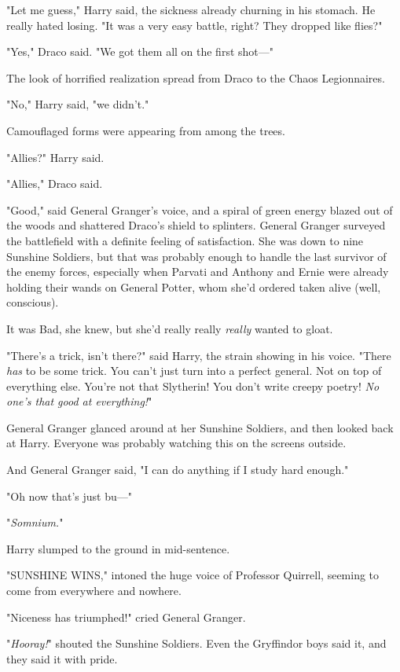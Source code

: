 "Let me guess," Harry said, the sickness already churning in his stomach. He
really hated losing. "It was a very easy battle, right? They dropped like
flies?"

"Yes," Draco said. "We got them all on the first shot\mbox{---}"

The look of horrified realization spread from Draco to the Chaos Legionnaires.

"No," Harry said, "we didn't."

Camouflaged forms were appearing from among the trees.

"Allies?" Harry said.

"Allies," Draco said.

"Good," said General Granger's voice, and a spiral of green energy blazed out
of the woods and shattered Draco's shield to splinters.
\sbreak
General Granger surveyed the battlefield with a definite feeling of
satisfaction. She was down to nine Sunshine Soldiers, but that was probably
enough to handle the last survivor of the enemy forces, especially when Parvati
and Anthony and Ernie were already holding their wands on General Potter, whom
she'd ordered taken alive (well, conscious).

It was Bad, she knew, but she'd really really \emph{really} wanted to gloat.

"There's a trick, isn't there?" said Harry, the strain showing in his voice.
"There \emph{has} to be some trick. You can't just turn into a perfect general.
Not on top of everything else. You're not that Slytherin! You don't write
creepy poetry! \emph{No one's that good at everything!}"

General Granger glanced around at her Sunshine Soldiers, and then looked back
at Harry. Everyone was probably watching this on the screens outside.

And General Granger said, "I can do anything if I study hard enough."

"Oh now that's just bu\mbox{---}"

"\emph{Somnium.}"

Harry slumped to the ground in mid-sentence.

"SUNSHINE WINS," intoned the huge voice of Professor Quirrell, seeming to come
from everywhere and nowhere.

"Niceness has triumphed!" cried General Granger.

"\emph{Hooray!}" shouted the Sunshine Soldiers. Even the Gryffindor boys said
it, and they said it with pride.


